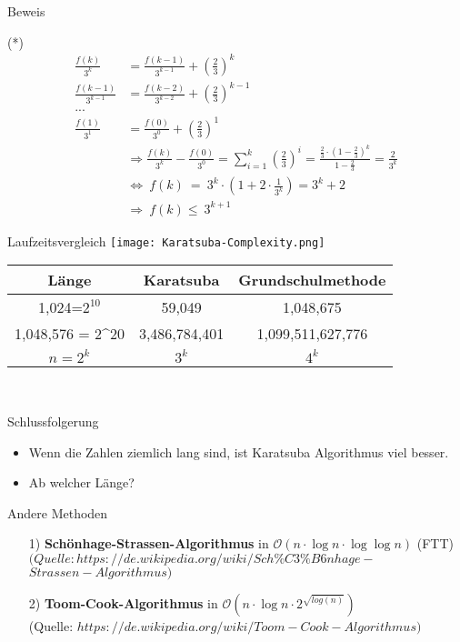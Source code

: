 \documentclass{beamer}
\begin{document}
\begin{frame}{Beweis}
    \begin{block}{(*)}
    \begin{align*}
        \frac{f(k)}{3^{k}} &= \frac{f(k - 1)}{3^{k-1}} + (\frac{2}{3})^{k}\\
        \frac{f(k-1)}{3^{k-1}} &= \frac{f(k - 2)}{3^{k-2}} + (\frac{2}{3})^{k-1}\\
        ...\\
        \frac{f(1)}{3^{1}} &= \frac{f(0)}{3^{0}} + (\frac{2}{3})^{1}\\
    & \Rightarrow \frac{f(k)}{3^{k}} - \frac{f(0)}{3^{0}} = \sum_{i = 1}^{k}(\frac{2}{3})^{i} = \frac{\frac{2}{3} \cdot (1-\frac{2}{3})^k}{1-\frac{2}{3}} = \frac{2}{3^k} \\
    & \Leftrightarrow \ f(k) \ = \ 3^{k} \cdot (1 + 2 \cdot \frac{1}{3^{k}}) = 3^{k} + 2\\    
    & \Rightarrow \ f(k) \leqslant \ 3^{k+1}
    \end{align*}
    \end{block}
\end{frame}

\begin{frame}{Laufzeitsvergleich}
\texttt{[image: Karatsuba-Complexity.png]}
    \setlength{\tabcolsep}{7mm}
\begin{tabular}{|c|c|c|}
	\hline
	Länge & Karatsuba & Grundschulmethode\\
	\hline
	1,024=$2^{10}$ &  59,049 &  1,048,675\\
	\hline
	1,048,576 = 2^{20} & 3,486,784,401 & 1,099,511,627,776\\
	\hline
	$n = 2^k$ & $3^k$ & $4^k$\\
	\hline
\end{tabular}\\
\end{frame}

\begin{frame}{Schlussfolgerung}
\begin{itemize}
    \item Wenn die Zahlen ziemlich lang sind, ist Karatsuba Algorithmus viel besser.
    \item Ab welcher Länge?
\end{itemize}
\end{frame}

\begin{frame}{Andere Methoden}
\begin{itemize}
    \item[1)] \textbf{Schönhage-Strassen-Algorithmus} in $\mathcal{O}(n \cdot \log{n} \cdot \log{\log{n}})$ (FTT)\\
    \footnotesize{$(Quelle: https://de.wikipedia.org/wiki/Sch\%C3\%B6nhage-$\\$Strassen-Algorithmus)$}
    \item[2)]
	\textbf{Toom-Cook-Algorithmus} in $\mathcal{O}(n \cdot \log{n} \cdot 2^{\sqrt{log{(n)}}})$\\
	\footnotesize{(Quelle: $https://de.wikipedia.org/wiki/Toom-Cook-Algorithmus)$}
\end{itemize}
\end{frame}
\end{document}
